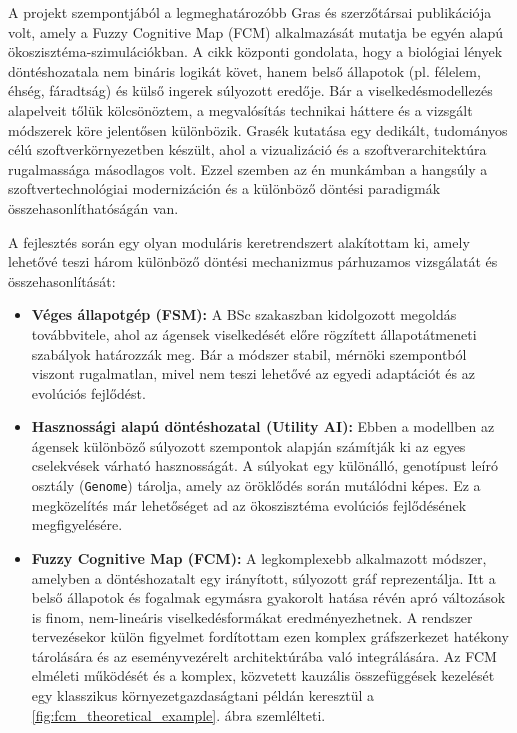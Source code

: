 A projekt szempontjából a legmeghatározóbb Gras és szerzőtársai publikációja \cite{Gras09} volt, amely a Fuzzy Cognitive Map (FCM) alkalmazását mutatja be egyén alapú ökoszisztéma-szimulációkban. A cikk központi gondolata, hogy a biológiai lények döntéshozatala nem bináris logikát követ, hanem belső állapotok (pl. félelem, éhség, fáradtság) és külső ingerek súlyozott eredője. Bár a viselkedésmodellezés alapelveit tőlük kölcsönöztem, a megvalósítás technikai háttere és a vizsgált módszerek köre jelentősen különbözik. Grasék kutatása egy dedikált, tudományos célú szoftverkörnyezetben készült, ahol a vizualizáció és a szoftverarchitektúra rugalmassága másodlagos volt. Ezzel szemben az én munkámban a hangsúly a szoftvertechnológiai modernizáción és a különböző döntési paradigmák összehasonlíthatóságán van.

A fejlesztés során egy olyan moduláris keretrendszert alakítottam ki, amely lehetővé teszi három különböző döntési mechanizmus párhuzamos vizsgálatát és összehasonlítását:

\begin{itemize}
    \item \textbf{Véges állapotgép (FSM):} A BSc szakaszban kidolgozott megoldás továbbvitele, ahol az ágensek viselkedését előre rögzített állapotátmeneti szabályok határozzák meg. Bár a módszer stabil, mérnöki szempontból viszont rugalmatlan, mivel nem teszi lehetővé az egyedi adaptációt és az evolúciós fejlődést.
    \item \textbf{Hasznossági alapú döntéshozatal (Utility AI):} Ebben a modellben az ágensek különböző súlyozott szempontok alapján számítják ki az egyes cselekvések várható hasznosságát. A súlyokat egy különálló, genotípust leíró osztály (\texttt{Genome}) tárolja, amely az öröklődés során mutálódni képes. Ez a megközelítés már lehetőséget ad az ökoszisztéma evolúciós fejlődésének megfigyelésére.
    \item \textbf{Fuzzy Cognitive Map (FCM):} A legkomplexebb alkalmazott módszer, amelyben a döntéshozatalt egy irányított, súlyozott gráf reprezentálja. Itt a belső állapotok és fogalmak egymásra gyakorolt hatása révén apró változások is finom, nem-lineáris viselkedésformákat eredményezhetnek. A rendszer tervezésekor külön figyelmet fordítottam ezen komplex gráfszerkezet hatékony tárolására és az eseményvezérelt architektúrába való integrálására. Az FCM elméleti működését és a komplex, közvetett kauzális összefüggések kezelését egy klasszikus környezetgazdaságtani példán keresztül a \ref{fig:fcm_theoretical_example}. ábra szemlélteti.
\end{itemize}

